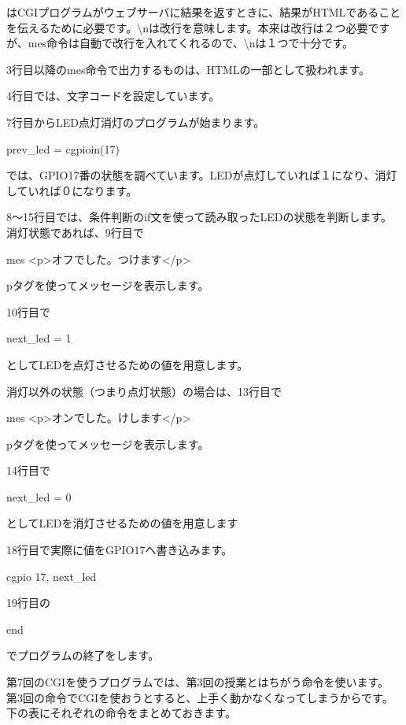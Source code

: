 \documentclass[a4paper,12pt,dvipdfmx]{jarticle}
\begin{document}
はCGIプログラムがウェブサーバに結果を返すときに、結果がHTMLであることを伝えるために必要です。{\textbackslash}nは改行を意味します。本来は改行は２つ必要ですが、mes命令は自動で改行を入れてくれるので、{\textbackslash}nは１つで十分です。


\bigskip

3行目以降のmes命令で出力するものは、HTMLの一部として扱われます。

4行目では、文字コードを設定しています。

7行目からLED点灯消灯のプログラムが始まります。

prev\_led = cgpioin(17)

では、GPIO17番の状態を調べています。LEDが点灯していれば１になり、消灯していれば０になります。


\bigskip


8〜15行目では、条件判断のif文を使って読み取ったLEDの状態を判断します。消灯状態であれば、9行目で

mes
{\textquotedbl}{\textless}p{\textgreater}オフでした。つけます{\textless}/p{\textgreater}{\textquotedbl}

pタグを使ってメッセージを表示します。

10行目で

next\_led = 1

としてLEDを点灯させるための値を用意します。

消灯以外の状態（つまり点灯状態）の場合は、13行目で

mes
{\textquotedbl}{\textless}p{\textgreater}オンでした。けします{\textless}/p{\textgreater}{\textquotedbl}

pタグを使ってメッセージを表示します。

14行目で

next\_led = 0

としてLEDを消灯させるための値を用意します

18行目で実際に値をGPIO17へ書き込みます。

cgpio 17, next\_led




\bigskip

19行目の

end

でプログラムの終了をします。


\bigskip


第7回のCGIを使うプログラムでは、第3回の授業とはちがう命令を使います。\\
第3回の命令でCGIを使おうとすると、上手く動かなくなってしまうからです。\\
下の表にそれぞれの命令をまとめておきます。\\
\end{document}
